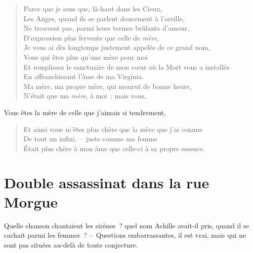\documentclass[french,twoside]{book} %
\begin{document}
\begin{verse}
Parce que je sens que, là-haut dans les Cieux,\\
Les Anges, quand ils se parlent doucement à l’oreille,\\
Ne trouvent pas, parmi leurs termes brûlants d’amour,\\
D’expression plus fervente que celle de \emph{mère},\\
Je vous ai dès longtemps justement appelée de ce grand nom,\\
Vous qui êtes plus qu’une mère pour moi\\
Et remplissez le sanctuaire de mon cœur où la Mort vous a installée\\
En affranchissant l’âme de ma Virginia.\\
Ma mère, ma propre mère, qui mourut de bonne heure,\\
N’était que ma \emph{mère}, à moi ; mais vous,\\
\end{verse}
\noindent Vous êtes la mère de celle que j’aimais si tendrement,\par

\begin{verse}
Et ainsi vous m’êtes plus chère que la mère que j’ai connue\\
De tout un infini, – juste comme ma femme\\
Était plus chère à mon âme que celle-ci à sa propre essence.\\
\end{verse}
\section[{Double assassinat dans la rue Morgue}]{Double assassinat dans la rue Morgue}\renewcommand{\leftmark}{Double assassinat dans la rue Morgue}

\noindent Quelle chanson chantaient les sirènes ? quel nom Achille avait-il pris, quand il se cachait parmi les femmes ? – Questions embarrassantes, il est vrai, mais qui ne sont pas situées au-delà de toute conjecture.\par
\end{document}
